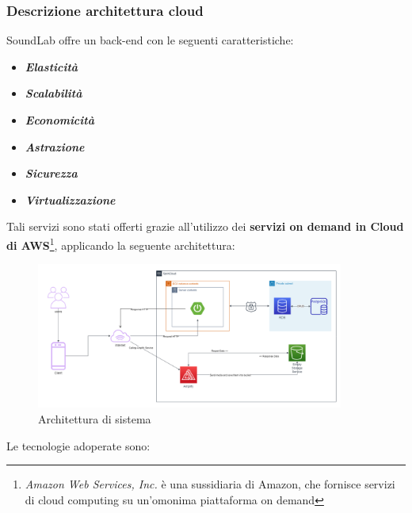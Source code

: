 \documentclass{article}
\begin{document}
		\subsubsection{Descrizione architettura cloud}
		SoundLab offre un back-end con le seguenti caratteristiche:
		\begin{itemize}
			\item \textbf{\textit{\textcolor{dark_purple}{Elasticità}}}
			\item \textbf{\textit{\textcolor{dark_purple}{Scalabilità}}}
			\item \textbf{\textit{\textcolor{dark_purple}{Economicità}}}
			\item \textbf{\textit{\textcolor{dark_purple}{Astrazione}}}
			\item \textbf{\textit{\textcolor{dark_purple}{Sicurezza}}}
			\item \textbf{\textit{\textcolor{dark_purple}{Virtualizzazione}}}
		\end{itemize}
		Tali servizi sono stati offerti grazie all'utilizzo dei \textbf{servizi on demand in Cloud di AWS}\footnote{\textit{Amazon Web Services, Inc.} è una sussidiaria di Amazon, che fornisce servizi di cloud computing su un'omonima piattaforma on demand}, applicando la seguente architettura:
		\begin{figure}[H]
			\centering
			\includegraphics[width=0.9\textwidth]{Immagini/springboot}
			\caption{Architettura di sistema}
		\end{figure}
		Le tecnologie adoperate sono:
\end{document}
